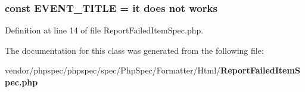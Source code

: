 \subsubsection[{E\+V\+E\+N\+T\+\_\+\+T\+I\+T\+L\+E}]{\setlength{\rightskip}{0pt plus 5cm}const E\+V\+E\+N\+T\+\_\+\+T\+I\+T\+L\+E = \textquotesingle{}it does not works\textquotesingle{}}\label{classspec_1_1_php_spec_1_1_formatter_1_1_html_1_1_report_failed_item_spec_ac15e1884cc3d167b7fb38cbdc5646050}


Definition at line 14 of file Report\+Failed\+Item\+Spec.\+php.



The documentation for this class was generated from the following file\+:\begin{DoxyCompactItemize}
\item 
vendor/phpspec/phpspec/spec/\+Php\+Spec/\+Formatter/\+Html/{\bf Report\+Failed\+Item\+Spec.\+php}\end{DoxyCompactItemize}
